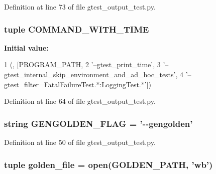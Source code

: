 \-Definition at line 73 of file gtest\-\_\-output\-\_\-test.\-py.

\hypertarget{namespacegtest__output__test_a1a365b5370c39cf439d8a2d73aac71e5}{
\subsubsection[{\-C\-O\-M\-M\-A\-N\-D\-\_\-\-W\-I\-T\-H\-\_\-\-T\-I\-M\-E}]{\setlength{\rightskip}{0pt plus 5cm}tuple {\bf \-C\-O\-M\-M\-A\-N\-D\-\_\-\-W\-I\-T\-H\-\_\-\-T\-I\-M\-E}}}\label{d6/dc2/namespacegtest__output__test_a1a365b5370c39cf439d8a2d73aac71e5}
{\bfseries \-Initial value\-:}
\begin{DoxyCode}
1 ({}, [PROGRAM_PATH,
2                           '--gtest_print_time',
3                           '--gtest_internal_skip_environment_and_ad_hoc_tests',
4                           '--gtest_filter=FatalFailureTest.*:LoggingTest.*'])
\end{DoxyCode}


\-Definition at line 64 of file gtest\-\_\-output\-\_\-test.\-py.

\hypertarget{namespacegtest__output__test_adc44f45fdf922dea887e490f308e00b2}{
\subsubsection[{\-G\-E\-N\-G\-O\-L\-D\-E\-N\-\_\-\-F\-L\-A\-G}]{\setlength{\rightskip}{0pt plus 5cm}string {\bf \-G\-E\-N\-G\-O\-L\-D\-E\-N\-\_\-\-F\-L\-A\-G} = '-\/-\/gengolden'}}\label{d6/dc2/namespacegtest__output__test_adc44f45fdf922dea887e490f308e00b2}


\-Definition at line 50 of file gtest\-\_\-output\-\_\-test.\-py.

\hypertarget{namespacegtest__output__test_ad964337c62007915e9fdd0c445cc9a2a}{
\subsubsection[{golden\-\_\-file}]{\setlength{\rightskip}{0pt plus 5cm}tuple {\bf golden\-\_\-file} = open({\bf \-G\-O\-L\-D\-E\-N\-\_\-\-P\-A\-T\-H}, 'wb')}}\label{d6/dc2/namespacegtest__output__test_ad964337c62007915e9fdd0c445cc9a2a}


